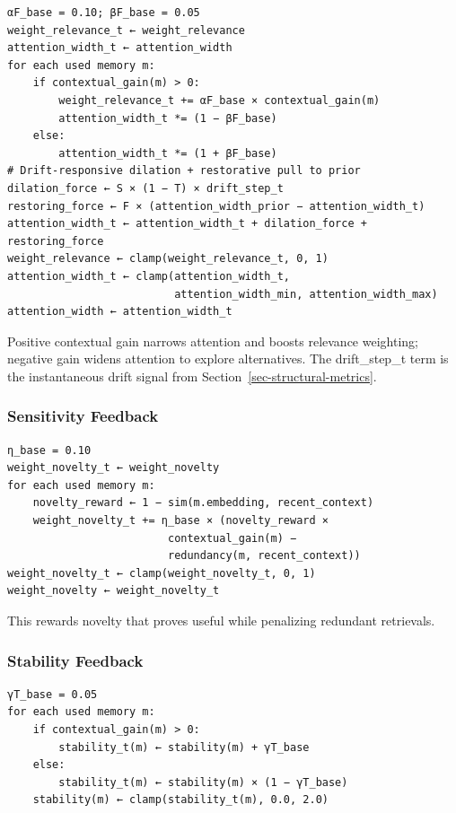 \documentclass[
  letterpaper,
  DIV=11,
  numbers=noendperiod]{scrartcl}
\begin{document}
\begin{verbatim}
αF_base = 0.10; βF_base = 0.05
weight_relevance_t ← weight_relevance
attention_width_t ← attention_width
for each used memory m:
    if contextual_gain(m) > 0:
        weight_relevance_t += αF_base × contextual_gain(m)
        attention_width_t *= (1 − βF_base)
    else:
        attention_width_t *= (1 + βF_base)
# Drift-responsive dilation + restorative pull to prior
dilation_force ← S × (1 − T) × drift_step_t
restoring_force ← F × (attention_width_prior − attention_width_t)
attention_width_t ← attention_width_t + dilation_force + restoring_force
weight_relevance ← clamp(weight_relevance_t, 0, 1)
attention_width_t ← clamp(attention_width_t,
                          attention_width_min, attention_width_max)
attention_width ← attention_width_t
\end{verbatim}

Positive contextual gain narrows attention and boosts relevance
weighting; negative gain widens attention to explore alternatives. The
drift\_step\_t term is the instantaneous drift signal from
Section~\ref{sec-structural-metrics}.

\subsubsection{Sensitivity Feedback}\label{sensitivity-feedback}

\begin{verbatim}
η_base = 0.10
weight_novelty_t ← weight_novelty
for each used memory m:
    novelty_reward ← 1 − sim(m.embedding, recent_context)
    weight_novelty_t += η_base × (novelty_reward ×
                         contextual_gain(m) −
                         redundancy(m, recent_context))
weight_novelty_t ← clamp(weight_novelty_t, 0, 1)
weight_novelty ← weight_novelty_t
\end{verbatim}

This rewards novelty that proves useful while penalizing redundant
retrievals.

\subsubsection{Stability Feedback}\label{stability-feedback}

\begin{verbatim}
γT_base = 0.05
for each used memory m:
    if contextual_gain(m) > 0:
        stability_t(m) ← stability(m) + γT_base
    else:
        stability_t(m) ← stability(m) × (1 − γT_base)
    stability(m) ← clamp(stability_t(m), 0.0, 2.0)
\end{verbatim}
\end{document}
